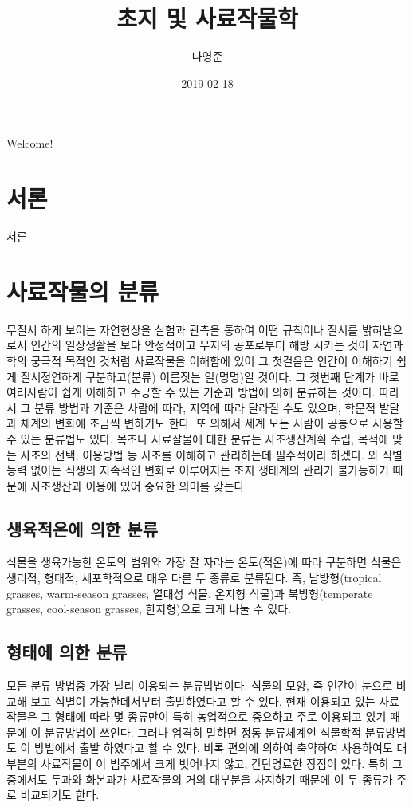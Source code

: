 \documentclass[]{book}
\title{초지 및 사료작물학}
\author{나영준}
\date{2019-02-18}
\begin{document}
\maketitle

{
\setcounter{tocdepth}{1}
\tableofcontents
}
Welcome!

\chapter{서론}\label{intro}

서론

\chapter{사료작물의 분류}\label{-}

무질서 하게 보이는 자연현상을 실험과 관측을 통하여 어떤 규칙이나 질서를
밝혀냄으로서 인간의 일상생활을 보다 안정적이고 무지의 공포로부터 해방
시키는 것이 자연과학의 궁극적 목적인 것처럼 사료작물을 이해함에 있어 그
첫걸음은 인간이 이해하기 쉽게 질서정연하게 구분하고(분류) 이름짓는
일(명명)일 것이다. 그 첫번째 단계가 바로 여러사람이 쉽게 이해하고 수긍할
수 있는 기준과 방법에 의해 분류하는 것이다. 따라서 그 분류 방법과 기준은
사람에 따라, 지역에 따라 달라질 수도 있으며, 학문적 발달과 체계의 변화에
조금씩 변하기도 한다. 또 의해서 세계 모든 사람이 공통으로 사용할 수 있는
분류법도 있다. 목초나 사료잘물에 대한 분류는 사초생산계획 수립, 목적에
맞는 사초의 선택, 이용방법 등 사초를 이해하고 관리하는데 필수적이라
하겠다. 와 식별능력 없이는 식생의 지속적인 변화로 이루어지는 초지
생태계의 관리가 불가능하기 때문에 사초생산과 이용에 있어 중요한 의미를
갖는다.

\section{생육적온에 의한 분류}\label{--}

식물을 생육가능한 온도의 범위와 가장 잘 자라는 온도(적온)에 따라
구분하면 식물은 생리적, 형태적, 세포학적으로 매우 다른 두 종류로
분류된다. 즉, 남방형(tropical grasses, warm-season grasses, 열대성 식물,
온지형 식물)과 북방형(temperate grasses, cool-season grasses,
한지형)으로 크게 나눌 수 있다.

\section{형태에 의한 분류}\label{--}

모든 분류 방법중 가장 널리 이용되는 분류밥법이다. 식물의 모양, 즉 인간이
눈으로 비교해 보고 식별이 가능한데서부터 출발하였다고 할 수 있다. 현재
이용되고 있는 사료작물은 그 형태에 따라 몇 종류만이 특히 농업적으로
중요하고 주로 이용되고 있기 때문에 이 분류방법이 쓰인다. 그러나 엄격히
말하면 정통 분류체계인 식물학적 분류방법도 이 방법에서 출발 하였다고 할
수 있다. 비록 편의에 의하여 축약하여 사용하여도 대부분의 사료작물이 이
범주에서 크게 벗어나지 않고, 간단명료한 장점이 있다. 특히 그 중에서도
두과와 화본과가 사료작물의 거의 대부분을 차지하기 때문에 이 두 종류가
주로 비교되기도 한다.
\end{document}
